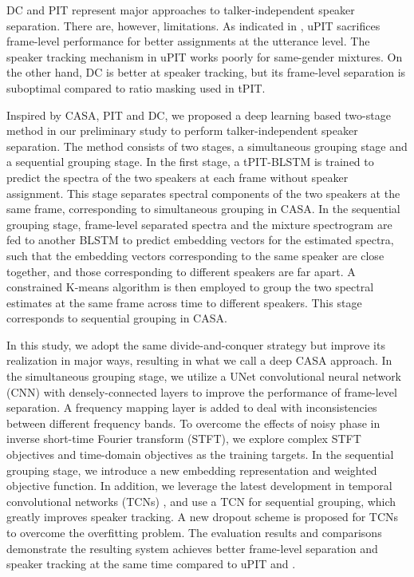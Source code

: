 \documentclass[journal]{IEEEtran}
\begin{document}
DC and PIT represent major approaches to talker-independent speaker separation. There are, however, limitations.
As indicated in \cite{PIT} \cite{me}, uPIT sacrifices frame-level performance for better assignments at the utterance level.
The speaker tracking mechanism in uPIT works poorly for same-gender mixtures.
On the other hand, DC is better at speaker tracking, but its frame-level separation is suboptimal compared to ratio masking used in tPIT.

Inspired by CASA, PIT and DC, we proposed a deep learning based two-stage method in our preliminary study \cite{me} to perform talker-independent speaker separation.
The method consists of two stages, a simultaneous grouping stage and a sequential grouping stage.
In the first stage, a tPIT-BLSTM is trained to predict the spectra of the two speakers at each frame without speaker assignment.
This stage separates spectral components of the two speakers at the same frame, corresponding to simultaneous grouping in CASA.
In the sequential grouping stage, frame-level separated spectra and the mixture spectrogram are fed to another BLSTM to predict embedding vectors for the estimated spectra, such that the embedding vectors corresponding to the same speaker are close together, and those corresponding to different speakers are far apart.
A constrained K-means algorithm is then employed to group the two spectral estimates at the same frame across time to different speakers.
This stage corresponds to sequential grouping in CASA.

In this study, we adopt the same divide-and-conquer strategy but improve its realization in major ways, resulting in what we call a deep CASA approach. 
In the simultaneous grouping stage, we utilize a UNet \cite{UNET0} convolutional neural network (CNN) with densely-connected layers \cite{DENSE} to improve the performance of frame-level separation. 
A frequency mapping layer is added to deal with inconsistencies between different frequency bands. 
To overcome the effects of noisy phase in inverse short-time Fourier transform (STFT), we explore complex STFT objectives and time-domain objectives as the training targets.
In the sequential grouping stage, we introduce a new embedding representation and weighted objective function.
In addition, we leverage the latest development in temporal convolutional networks (TCNs) \cite{TCN1} \cite{TCN0} \cite{Tasnet} \cite{ashu}, and use a TCN for sequential grouping, which greatly improves speaker tracking.
A new dropout scheme is proposed for TCNs to overcome the overfitting problem.
The evaluation results and comparisons demonstrate the resulting system achieves better frame-level separation and speaker tracking at the same time  compared to uPIT and \cite{me}. 
\end{document}
